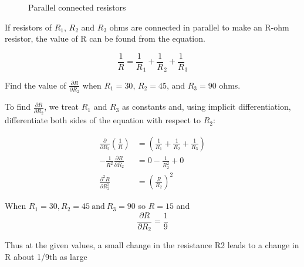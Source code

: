 \documentclass[12pt,a4paper]{article}
\begin{document}
\begin{example}
    \begin{figure}[!ht]
        \centering
        
        \caption{Parallel connected resistors}
        \label{fig:parallelres}
    \end{figure}

    If resistors of \(R_1\), \(R_2\) and \(R_3\) ohms are connected in parallel to make an R-ohm resistor, the value of R can be found from the equation.

    \[\frac1R =  \frac1R_1 + \frac1R_2 + \frac1R_3\]

    Find the value of \(\frac{\partial R}{\partial R_2}\) when \(R_1 = 30\), \(R_2 = 45\), and \(R_3 = 90\) ohms. 

    \begin{solution}
        
        To find \(\frac{\partial R}{\partial R_2}\), we treat \(R_1\) and \(R_3\) as constants and, using implicit differentiation, differentiate both sides of the equation with respect to \(R_2\):

        
        \begin{align*}
            \frac{\partial}{\partial R_2}\left(\frac{1}{R}\right) &= \left(\frac{1}{R_1} + \frac{1}{R_2} + \frac{1}{R_3}\right)\\
            -\frac{1}{R^2} \frac{\partial R}{\partial R_2} &= 0 - \frac{1}{R_2^2} + 0 \\
            \frac{\partial^2 R}{\partial R_2^2} &= \left(\frac{R}{R_2}\right)^2
        \end{align*}
        
        When \(R_1 = 30, R_2 = 45 \ \text{and} \ R_3 = 90 \) so \(R=15\) and
        \[\frac{\partial R}{\partial R_2} = \frac19\]
    \end{solution}
    Thus at the given values, a small change in the resistance R2 leads to a change in R about
    1/9th as large
\end{example}
\end{document}
